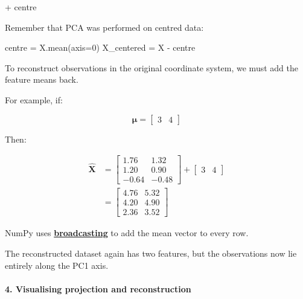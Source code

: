 \documentclass[11pt]{article}
\newenvironment{Shaded}{}{}
\newcommand{\DecValTok}[1]{\textcolor[rgb]{0.25,0.63,0.44}{{#1}}}
\newcommand{\NormalTok}[1]{{#1}}
\newcommand{\OperatorTok}[1]{\textcolor[rgb]{0.40,0.40,0.40}{{#1}}}
\begin{document}
\begin{Shaded}
\begin{Highlighting}[]
\OperatorTok{+}\NormalTok{ centre}
\end{Highlighting}
\end{Shaded}

Remember that PCA was performed on centred data:

\begin{Shaded}
\begin{Highlighting}[]
\NormalTok{centre }\OperatorTok{=}\NormalTok{ X.mean(axis}\OperatorTok{=}\DecValTok{0}\NormalTok{)}
\NormalTok{X\_centered }\OperatorTok{=}\NormalTok{ X }\OperatorTok{{-}}\NormalTok{ centre}
\end{Highlighting}
\end{Shaded}

To reconstruct observations in the original coordinate system, we must
add the feature means back.

For example, if:

\[
\boldsymbol\mu=
\begin{bmatrix}
3 & 4
\end{bmatrix}
\]

Then:

\[
\begin{aligned}
\hat{\mathbf X}
&=
\begin{bmatrix}
1.76 & 1.32\\
1.20 & 0.90\\
-0.64 & -0.48
\end{bmatrix}
+
\begin{bmatrix}
3 & 4
\end{bmatrix}\\[6pt]
&=
\boxed{
\begin{bmatrix}
4.76 & 5.32\\
4.20 & 4.90\\
2.36 & 3.52
\end{bmatrix}
}
\end{aligned}
\]

NumPy uses
\href{https://numpy.org/doc/2.5/user/basics.broadcasting.html}{\textbf{broadcasting}}
to add the mean vector to every row.

The reconstructed dataset again has two features, but the observations
now lie entirely along the PC1 axis.

\paragraph{4. Visualising projection and
reconstruction}\label{visualising-projection-and-reconstruction}
\end{document}
